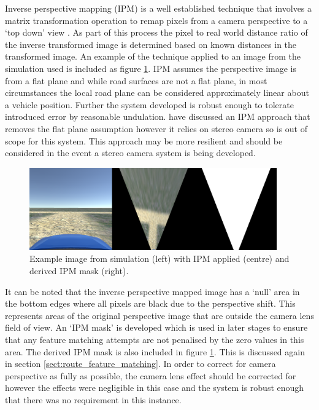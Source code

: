 \documentclass[]{aiaa-tc}%
\begin{document}
Inverse perspective mapping (IPM) is a well established technique that involves a matrix transformation operation to remap pixels from a camera perspective to a `top down' view \citep{compVisionTextbook}. As part of this process the pixel to real world distance ratio of the inverse transformed image is determined based on known distances in the transformed image. An example of the technique applied to an image from the simulation used is included as figure \ref{f:ipmSim}. IPM assumes the perspective image is from a flat plane \citep{ipmForLaneTracking} and while road surfaces are not a flat plane, in most circumstances the local road plane can be considered approximately linear about a vehicle position. Further the system developed is robust enough to tolerate introduced error by reasonable undulation. \citet{extendedIPM} have discussed an IPM approach that removes the flat plane assumption however it relies on stereo camera so is out of scope for this system. This approach may be more resilient and should be considered in the event a stereo camera system is being developed.


\begin{figure}
	\centering
	\includegraphics[width=0.95\textwidth]{RoadDetection/ipmSim.png}
	\caption{Example image from simulation (left) with IPM applied (centre) and derived IPM mask (right).}
	\label{f:ipmSim}
\end{figure}

It can be noted that the inverse perspective mapped image has a `null' area in the bottom edges where all pixels are black due to the perspective shift. This represents areas of the original perspective image that are outside the camera lens field of view. An `IPM mask' is developed which is used in later stages to ensure that any feature matching attempts are not penalised by the zero values in this area. The derived IPM mask is also included in figure \ref{f:ipmSim}. This is discussed again in section \ref{sect:route_feature_matching}. In order to correct for camera perspective as fully as possible, the camera lens effect should be corrected for \citep{fisheyeEffect} however the effects were negligible in this case and the system is robust enough that there was no requirement in this instance.
\end{document}
